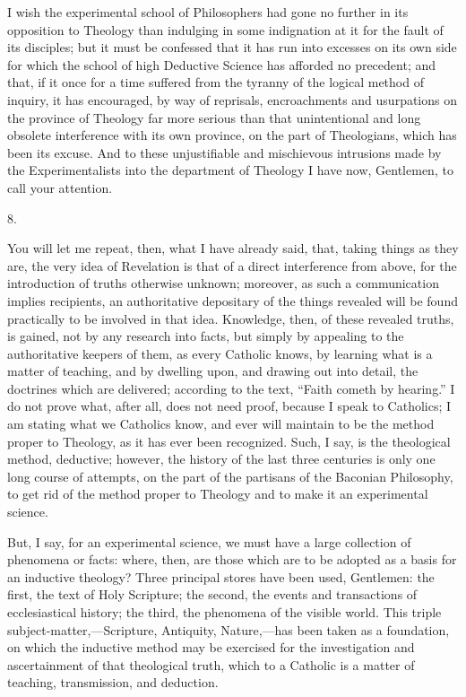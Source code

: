 I wish the experimental school of Philosophers had gone no further
in its opposition to Theology than indulging in some indignation at it
for the fault of its disciples; but it must be confessed that it has
run into excesses on its own side for which the school of high
Deductive Science has afforded no precedent; and that, if it once for
a time suffered from the tyranny of the logical method of inquiry, it
has encouraged, by way of reprisals, encroachments and usurpations on
the province of Theology far more serious than that unintentional and
long obsolete interference with its own province, on the part of
Theologians, which has been its excuse. And to these unjustifiable and
mischievous intrusions made by the Experimentalists into the
department of Theology I have now, Gentlemen, to call your attention.

8.

You will let me repeat, then, what I have already said, that,
taking things as they are, the very idea of Revelation is that of a
direct interference from above, for the introduction of truths
otherwise unknown; moreover, as such a communication implies
recipients, an authoritative depositary of the things revealed
will be found practically to be involved in that idea. Knowledge,
then, of these revealed truths, is gained, not by any research into
facts, but simply by appealing to the authoritative keepers of them,
as every Catholic knows, by learning what is a matter of teaching, and
by dwelling upon, and drawing out into detail, the doctrines which are
delivered; according to the text, ``Faith cometh by hearing.''
I do not prove what, after all, does not need proof, because I speak
to Catholics; I am stating what we Catholics know, and ever will
maintain to be the method proper to Theology, as it has ever been
recognized. Such, I say, is the theological method, deductive;
however, the history of the last three centuries is only one long
course of attempts, on the part of the partisans of the Baconian
Philosophy, to get rid of the method proper to Theology and to make it
an experimental science.

But, I say, for an experimental science, we must have a large
collection of phenomena or facts: where, then, are those which are to
be adopted as a basis for an inductive theology? Three principal
stores have been used, Gentlemen: the first, the text of Holy
Scripture; the second, the events and transactions of ecclesiastical
history; the third, the phenomena of the visible world. This triple
subject-matter,—Scripture, Antiquity, Nature,—has been taken as a
foundation, on which the inductive method may be exercised for the
investigation and ascertainment of that theological truth, which to a
Catholic is a matter of teaching, transmission, and deduction.

